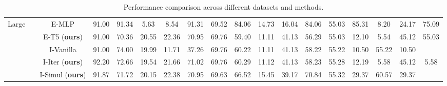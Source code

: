 \begin{table*}[ht]
{\begin{tabular}{ccc|ccccc|ccccc|ccccc}
        \midrule
        \multirow{5}{*}{Large} & \multirow{5}{*}{}
        & E-MLP & 91.00 & 91.34 & 5.63 & 8.54 & 91.31 & 69.52 & 84.06 & 14.73 & 16.04 & 84.06 & 55.03 & 85.31 & 8.20 & 24.17 & 75.09 \\
        & & E-T5 (\textbf{ours}) & 91.00 & 70.36 & 20.55 & 22.36 & 70.95 & 69.76 & 59.40 & 11.11 & 41.13 & 56.29 & 55.03 & 12.10 & 5.54 & 45.12 & 55.03 \\
        & & I-Vanilla & 91.00 & 74.00 & 19.99 & 11.71 & 37.26 & 69.76 & 60.22 & 11.11 & 41.13 & 58.22 & 55.22 & 10.50 & 55.22 & 10.50 \\
        & & I-Iter (\textbf{ours}) & 92.20 & 72.66 & 19.54 & 21.66 & 71.02 & 69.76 & 60.29 & 11.12 & 41.13 & 58.23 & 55.28 & 12.19 & 5.58 & 45.12 & 5.58 \\
        & & I-Simul (\textbf{ours}) & 91.87 & 71.72 & 20.15 & 22.38 & 70.95 & 69.63 & 66.52 & 15.45 & 39.17 & 70.84 & 55.32 & 29.37 & 60.57 & 29.37 \\
        \bottomrule
    \end{tabular}
    }
    \caption{Performance comparison across different datasets and methods.}
    \label{tab:performance_comparison}
\end{table*}





